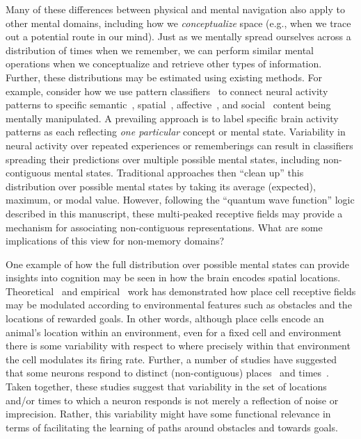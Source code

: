 \documentclass{article}
\begin{document}
Many of these differences between physical and mental navigation also apply to other mental domains, including how we \textit{conceptualize} space (e.g., when we trace out a potential route in our mind).  Just as we mentally spread ourselves across a distribution of times when we remember, we can perform similar mental operations when we conceptualize and retrieve other types of information.  Further, these distributions may be estimated using existing methods.  For example, consider how we use pattern classifiers~\citep{NormEtal06b} to connect neural activity patterns to specific semantic~\citep{PolyEtal05a, MitcEtal08a, MannEtal12}, spatial~\citep{MillEtal13}, affective~\citep{ChanEtal18}, and social~\citep{MeyeEtal18} content being mentally manipulated.  A prevailing approach is to label specific brain activity patterns as each reflecting \textit{one particular} concept or mental state.  Variability in neural activity over repeated experiences or rememberings can result in classifiers spreading their predictions over multiple possible mental states, including non-contiguous mental states.  Traditional approaches then ``clean up'' this distribution over possible mental states by taking its average (expected), maximum, or modal value.  However, following the ``quantum wave function'' logic described in this manuscript, these multi-peaked receptive fields may provide a mechanism for associating non-contiguous representations.  What are some implications of this view for non-memory domains?

One example of how the full distribution over possible mental states can provide insights into cognition may be seen in how the brain encodes spatial locations.  Theoretical~\citep[e.g., ][]{GersAbbo97} and empirical~\citep[e.g., ][]{PfeiFost13} work has demonstrated how place cell receptive fields may be modulated according to environmental features such as obstacles and the locations of rewarded goals.  In other words, although place cells encode an animal's location within an environment, even for a fixed cell and environment there is some variability with respect to where precisely within that environment the cell modulates its firing rate.  Further, a number of studies have suggested that some neurons respond to distinct (non-contiguous) places~\citep{FentEtal08, RichEtal14b, LeeEtal19, DerdEtal09, GrieEtal20} and times~\citep{PastEtal08}.  Taken together, these studies suggest that variability in the set of locations and/or times to which a neuron responds is not merely a reflection of noise or imprecision.  Rather, this variability might have some functional relevance in terms of facilitating the learning of paths around obstacles and towards goals.
\end{document}
